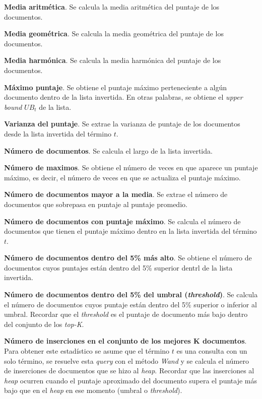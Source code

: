 \begin{list}{}{}
	\item \textbf{Media aritmética}. Se calcula la media aritmética del puntaje de los documentos.

	\item \textbf{Media geométrica}. Se calcula la media geométrica del puntaje de los documentos.

	\item \textbf{Media harmónica}.  Se calcula la media harmónica del puntaje de los documentos. 

	\item \textbf{Máximo puntaje}. Se obtiene el puntaje máximo perteneciente a algún documento dentro de la lista invertida. En otras palabras, se obtiene el \textit{upper bound} $UB_t$ de la lista. 

	\item \textbf{Varianza del puntaje}. Se extrae la varianza de puntaje de los documentos desde la lista invertida del término $t$. 
	
	\item \textbf{Número de documentos}. Se calcula el largo de la lista invertida. 

	\item \textbf{Número de maximos}. Se obtiene el número de veces en que aparece un puntaje máximo, es decir, el número de veces en que se actualiza el puntaje máximo. 

	\item \textbf{Número de documentos mayor a la media}. Se extrae el número de documentos que sobrepasa en puntaje al puntaje promedio. 
	
	\item \textbf{Número de documentos con puntaje máximo}. Se calcula el número de documentos que tienen el puntaje máximo dentro en la lista invertida del término $t$. 
	
	\item \textbf{Número de documentos dentro del 5\% más alto}. Se obtiene el número de documentos cuyos puntajes están dentro del 5\% superior dentrl de la lista invertida. 
	
	\item \textbf{Número de documentos dentro del 5\% del umbral (\textit{threshold})}. Se calcula el número de documentos cuyos puntaje están dentro del 5\% superior o inferior al umbral. Recordar que el \textit{threshold} es el puntaje de documento más bajo dentro del conjunto de los \textit{top-K}.
	
	\item \textbf{Número de inserciones en el conjunto de los mejores K documentos}. Para obtener este estadístico se asume que el término $t$ es una consulta con un solo término, se resuelve esta \textit{query} con el método \textit{Wand}  y se calcula el número de inserciones de documentos que se hizo al \textit{heap}. Recordar que las inserciones al \textit{heap} ocurren cuando el puntaje aproximado del documento supera el puntaje más bajo que en el \textit{heap} en ese momento (umbral o \textit{threshold}).
	

\end{list}
